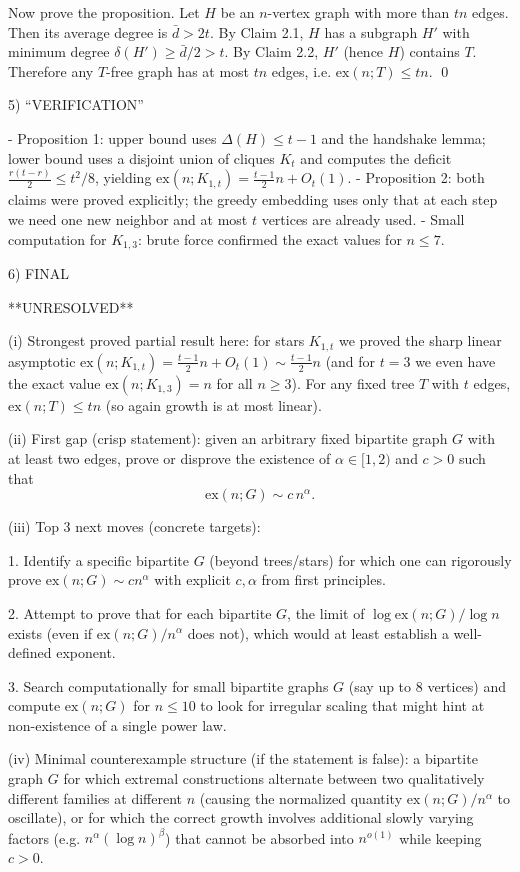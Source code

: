 Now prove the proposition. Let $H$ be an $n$-vertex graph with more than $t n$ edges. Then its average degree is $\bar d>2t$. By Claim 2.1, $H$ has a subgraph $H'$ with minimum degree $\delta(H')\ge \bar d/2>t$. By Claim 2.2, $H'$ (hence $H$) contains $T$. Therefore any $T$-free graph has at most $t n$ edges, i.e. $\mathrm{ex}(n;T)\le t n$.
\qed

5) “VERIFICATION”

- Proposition 1: upper bound uses $\Delta(H)\le t-1$ and the handshake lemma; lower bound uses a disjoint union of cliques $K_t$ and computes the deficit $\frac{r(t-r)}{2}\le t^2/8$, yielding $\mathrm{ex}(n;K_{1,t})=\frac{t-1}{2}n+O_t(1)$. 
- Proposition 2: both claims were proved explicitly; the greedy embedding uses only that at each step we need one new neighbor and at most $t$ vertices are already used.
- Small computation for $K_{1,3}$: brute force confirmed the exact values for $n\le 7$.

6) FINAL

**UNRESOLVED**

(i) Strongest proved partial result here: for stars $K_{1,t}$ we proved the sharp linear asymptotic $\mathrm{ex}(n;K_{1,t})=\frac{t-1}{2}n+O_t(1)\sim \frac{t-1}{2}n$ (and for $t=3$ we even have the exact value $\mathrm{ex}(n;K_{1,3})=n$ for all $n\ge 3$). For any fixed tree $T$ with $t$ edges, $\mathrm{ex}(n;T)\le t n$ (so again growth is at most linear).

(ii) First gap (crisp statement): given an arbitrary fixed bipartite graph $G$ with at least two edges, prove or disprove the existence of $\alpha\in[1,2)$ and $c>0$ such that
\[
\mathrm{ex}(n;G) \sim c\,n^{\alpha}.
\]

(iii) Top 3 next moves (concrete targets):

1. Identify a specific bipartite $G$ (beyond trees/stars) for which one can rigorously prove $\mathrm{ex}(n;G)\sim c n^{\alpha}$ with explicit $c,\alpha$ from first principles.

2. Attempt to prove that for each bipartite $G$, the limit of $\log \mathrm{ex}(n;G)/\log n$ exists (even if $\mathrm{ex}(n;G)/n^{\alpha}$ does not), which would at least establish a well-defined exponent.

3. Search computationally for small bipartite graphs $G$ (say up to 8 vertices) and compute $\mathrm{ex}(n;G)$ for $n\le 10$ to look for irregular scaling that might hint at non-existence of a single power law.

(iv) Minimal counterexample structure (if the statement is false): a bipartite graph $G$ for which extremal constructions alternate between two qualitatively different families at different $n$ (causing the normalized quantity $\mathrm{ex}(n;G)/n^{\alpha}$ to oscillate), or for which the correct growth involves additional slowly varying factors (e.g. $n^{\alpha}(\log n)^{\beta}$) that cannot be absorbed into $n^{o(1)}$ while keeping $c>0$.




